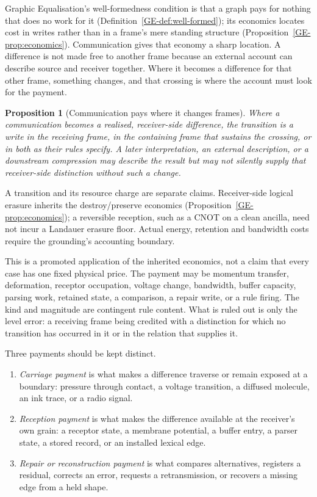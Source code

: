 \documentclass[11pt,a4paper]{article}
\newtheorem{proposition}[definition]{Proposition}
\theoremstyle{remark}\newtheorem{remark}[definition]{Remark}
\begin{document}
Graphic Equalisation's well-formedness condition is that a graph pays for nothing
that does no work for it (Definition~\ref{GE-def:well-formed}); its economics
locates cost in writes rather than in a frame's mere standing structure
(Proposition~\ref{GE-prop:economics}). Communication gives that economy a sharp
location. A difference is not made free to another frame because an external
account can describe source and receiver together. Where it becomes a difference
for that other frame, something changes, and that crossing is where the account
must look for the payment.

\begin{proposition}[Communication pays where it changes frames]\label{prop:pays-at-crossing}
Where a communication becomes a realised, receiver-side difference, the
transition is a write in the receiving frame, in the containing frame that
sustains the crossing, or in both as their rules specify. A later interpretation,
an external description, or a downstream compression may describe the result but
may not silently supply that receiver-side distinction without such a change.
\end{proposition}
A transition and its resource charge are separate claims. Receiver-side
logical erasure inherits the destroy/preserve economics
(Proposition~\ref{GE-prop:economics}); a reversible reception, such as a CNOT
on a clean ancilla, need not incur a Landauer erasure floor. Actual energy,
retention and bandwidth costs require the grounding's accounting boundary.



This is a promoted application of the inherited economics, not a claim that every
case has one fixed physical price. The payment may be momentum transfer,
deformation, receptor occupation, voltage change, bandwidth, buffer capacity,
parsing work, retained state, a comparison, a repair write, or a rule firing. The
kind and magnitude are contingent rule content. What is ruled out is only the
level error: a receiving frame being credited with a distinction for which no
transition has occurred in it or in the relation that supplies it.

Three payments should be kept distinct.
\begin{enumerate}[leftmargin=*]
\item \emph{Carriage payment} is what makes a difference traverse or remain exposed
at a boundary: pressure through contact, a voltage transition, a diffused molecule,
an ink trace, or a radio signal.
\item \emph{Reception payment} is what makes the difference available at the
receiver's own grain: a receptor state, a membrane potential, a buffer entry, a
parser state, a stored record, or an installed lexical edge.
\item \emph{Repair or reconstruction payment} is what compares alternatives,
registers a residual, corrects an error, requests a retransmission, or recovers a
missing edge from a held shape.
\end{enumerate}
\end{document}
